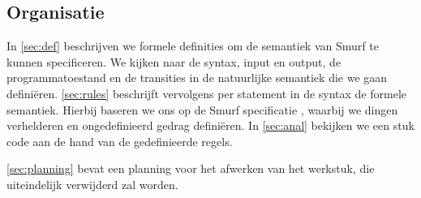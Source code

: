 \subsection{Organisatie} %

In \autoref{sec:def} beschrijven we formele definities om de semantiek van
Smurf te kunnen specificeren. We kijken naar de syntax, input en output, de
programmatoestand en de transities in de natuurlijke semantiek die we gaan
definiëren. \autoref{sec:rules} beschrijft vervolgens per statement in de
syntax de formele semantiek. Hierbij baseren we ons op de Smurf specificatie
\cite{safalra}, waarbij we dingen verhelderen en ongedefinieerd gedrag
definiëren. In \autoref{sec:anal} bekijken we een stuk code aan de hand van de
gedefinieerde regels.

\autoref{sec:planning} bevat een planning voor het afwerken van het werkstuk,
die uiteindelijk verwijderd zal worden.

